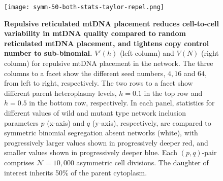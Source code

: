 \documentclass{article}
\begin{document}
\begin{appendices}
\begin{figure}
\centering
\texttt{[image: symm-50-both-stats-taylor-repel.png]}
\caption{\textbf{Repulsive reticulated mtDNA placement reduces cell-to-cell variability in mtDNA quality compared to random reticulated mtDNA placement, and tightens copy control number to sub-binomial.} $V'(h)$ (left column) and $V(N)$ (right column) for repulsive mtDNA placement in the network. The three columns to a facet show the different seed numbers, $4, 16$ and $64$, from left to right, respectively. The two rows to a facet show different parent heteroplasmy levels, $h=0.1$ in the top row and $h=0.5$ in the bottom row, respectively. In each panel, statistics for different values of wild and mutant type network inclusion parameters $p$ (x-axis) and $q$ (y-axis), respectively, are compared to symmetric binomial segregation absent networks (white), with progressively larger values shown in progressively deeper red, and smaller values shown in progressively deeper blue. Each $(p,q)$-pair comprises $\mathcal{N}=10,000$ asymmetric cell divisions. The daughter of interest inherits 50\% of the parent cytoplasm.}\label{fig:symm-50-both-stats-repel-taylor}
\end{figure}



\end{appendices}
\end{document}
